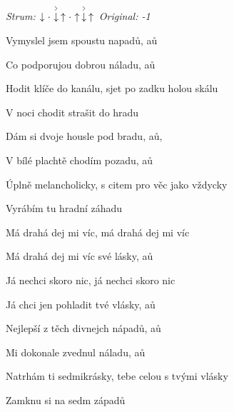 \begin{song}


\begin{headerbox}
\textit{Strum:} $\Down\Miss\AccentDown\Up\Miss\Up\AccentDown\Up$ \quad
\textit{Original: -1}
\end{headerbox}

\begin{hchordbox}
\end{hchordbox}

\Large

\bigskip

Vymyslel jsem spoustu napadů, aů \par
Co podporujou dobrou náladu, aů \par
{}Hodit klíče do kanálu, sjet po zadku holou skálu \par
{}V noci chodit strašit do hradu \par

\bigskip

Dám si dvoje housle pod bradu, aů,  \par
{}V bílé plachtě chodím pozadu, aů \par
{}Úplně melancholicky, s citem pro věc jako vždycky \par
{}Vyrábím tu hradní záhadu  \par

\bigskip

\begin{chorusbox}{\Refren}
 Má drahá dej mi víc,  má drahá dej mi víc \par
{} Má drahá dej mi víc své lásky, aů \par
{} Já nechci skoro nic,  já nechci skoro nic \par
{} Já chci jen pohladit tvé vlásky, aů \par
\end{chorusbox}

\bigskip

Nejlepší z těch divnejch nápadů, aů \par
Mi dokonale zvednul náladu, aů \par
{}Natrhám ti sedmikrásky, tebe celou s tvými vlásky \par
{}Zamknu si na sedm západů  \par


\end{song}
